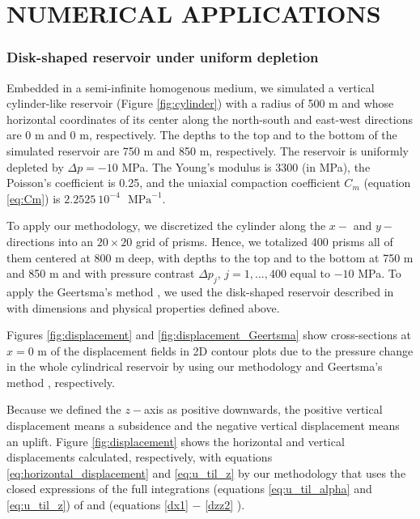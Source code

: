 \documentclass[journal abbreviation, manuscript]{copernicus}
\begin{document}
\section{NUMERICAL APPLICATIONS}

\subsubsection{Disk-shaped reservoir under uniform depletion}

Embedded in a semi-infinite homogenous medium, we simulated a vertical cylinder-like reservoir (Figure \ref{fig:cylinder}) with a radius of 500 m and whose horizontal coordinates of its center along the north-south and east-west directions are 0 m and 0 m, respectively.
The depths to the top and to the bottom of the simulated reservoir are 750 m and 850 m, respectively.
The reservoir is uniformly depleted by $\Delta p = -10$ MPa. 
The Young’s modulus is  3300 (in MPa), the Poisson's coefficient is 0.25, and
the uniaxial compaction coefficient $C_{m}$  (equation \ref{eq:Cm}) is 
$2.2525 \: 10^{-4}$ $\textrm{ MPa}^{-1}$.

To apply our methodology, we  discretized the cylinder  along the $x-$ and $y-$ directions into an $20 \times 20$ grid of prisms. Hence, we totalized 400 prisms all of them centered at 800 m deep, with depths to the top and to the bottom at 750 m and 850 m  and with pressure contrast $\Delta p_j$, $j = 1, ..., 400$ equal to $-10$ MPa.
To apply the Geertsma’s method \citep{Geertsma73}, we used the disk-shaped reservoir described in \cite{Fjaer08} with dimensions and physical properties defined above.
 
Figures \ref{fig:displacement}  and \ref{fig:displacement_Geertsma}  show cross-sections at 
$x  = 0$ m of the displacement fields in 2D contour plots  due to the pressure change in the whole  cylindrical reservoir by using our methodology and Geertsma’s method \citep{Geertsma73}, respectively.

Because we defined the $z-$axis as positive downwards, the positive vertical displacement means a subsidence and the negative vertical displacement means an uplift.
Figure \ref{fig:displacement}  shows the horizontal and vertical displacements  calculated, respectively, with equations \ref{eq:horizontal_displacement} and \ref{eq:u_til_z} by our methodology that uses the closed expressions of the full integrations (equations \ref{eq:u_til_alpha} and \ref{eq:u_til_z}) of \cite{Nagyetal2000} and \cite{Nagyetal2002} (equations \ref{dx1} $-$ \ref{dzz2} ).
\end{document}
